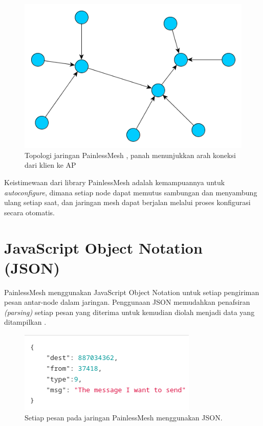 \begin{figure}[h]
	\centering
	\includegraphics[scale=0.5]{./assets/painlessmesh}
	\caption{Topologi jaringan PainlessMesh \cite{HomeWikiPainlessMesh}, panah menunjukkan arah koneksi dari klien ke AP}
\end{figure}

Keistimewaan dari library PainlessMesh adalah kemampuannya untuk \textit{autoconfigure}, dimana setiap node dapat memutus sambungan dan menyambung ulang setiap saat, dan jaringan mesh dapat berjalan melalui proses konfigurasi secara otomatis.

\section{JavaScript Object Notation (JSON)}
PainlessMesh menggunakan JavaScript Object Notation untuk setiap pengiriman pesan antar-node dalam jaringan. Penggunaan JSON memudahkan penafsiran \textit{(parsing)} setiap pesan yang diterima untuk kemudian diolah menjadi data yang ditampilkan \cite{MeshProtocolWiki}.

\begin{figure}[h]
	\centering
	\includegraphics[scale=0.5]{./assets/PainlessMeshJSON}
	\caption{Setiap pesan pada jaringan PainlessMesh menggunakan JSON.}
\end{figure}

